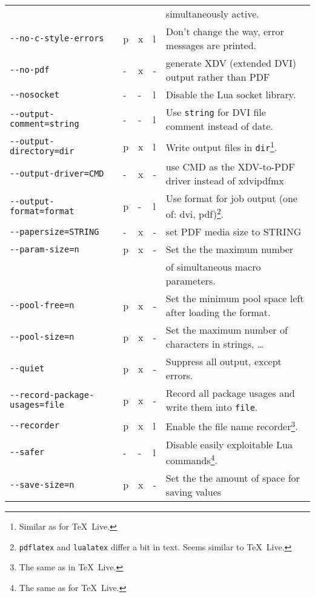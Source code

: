 \documentclass[a4paper, english]{article}%
\newcommand{\pdflatex}{\texttt{pdflatex}}
\newcommand{\lualatex}{\texttt{lualatex}}
\newcommand{\texlive}{\TeX~Live}
\begin{document}
{\begin{longtable}{|lllll|}
                                      &  & &        & simultaneously active. \\
\texttt{-{}-no-c-style-errors}        & p&x&l       & Don't change the way, error messages are printed. \\
\texttt{-{}-no-pdf}                   & -&x&- & generate XDV (extended DVI) output rather than PDF \\
\texttt{-{}-nosocket}                 & -&-&l & Disable the Lua socket library. \\
\texttt{-{}-output-comment=string}    & -&-&l & Use \texttt{string} for DVI file comment instead of date. \\
\texttt{-{}-output-directory=dir}     & p&x&l       & Write output files in \texttt{dir}\footnote%
{Similar as for \texlive. }. \\
\texttt{-{}-output-driver=CMD}        & -&x&- & use CMD as the XDV-to-PDF driver instead of xdvipdfmx \\
\texttt{-{}-output-format=format}     & p&-&l  & Use format for job output (one of: dvi, pdf)\footnote%
{\pdflatex{} and \lualatex{} differ a bit in text. Seems similar to \texlive. }. \\
\texttt{-{}-papersize=STRING}         & -&x&- & set PDF media size to STRING \\
\texttt{-{}-param-size=n}             & p&x&- & Set the the maximum number \\
                                      &  & &        & of simultaneous macro parameters. \\
\texttt{-{}-pool-free=n}              & p&x&- & Set the minimum pool space left after loading the format. \\
\texttt{-{}-pool-size=n}              & p&x&- & Set the maximum number of characters in strings, \dots \\
\texttt{-{}-quiet}                    & p&x&- & Suppress all output, except errors. \\
\texttt{-{}-record-package-usages=file} & p&x&- & Record all package usages and write them into \texttt{file}. \\
\texttt{-{}-recorder}                 & p&x&l       & Enable the file name recorder\footnote%
{The same as in \texlive. }. \\
\texttt{-{}-safer}                    & -&-&l & Disable easily exploitable Lua commands\footnote%
   {The same as for \texlive. }.   \\
\texttt{-{}-save-size=n}              & p&x&- & Set the the amount of space for saving values \\

\end{longtable}}
\end{document}
